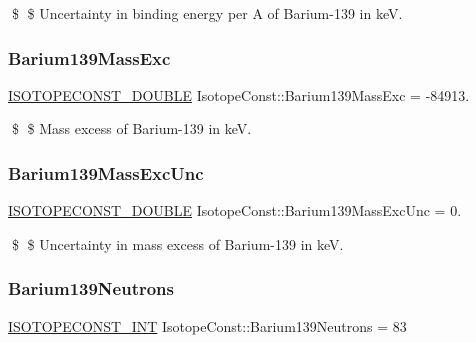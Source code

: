 \$ \$ Uncertainty in binding energy per A of Barium-\/139 in keV. \mbox{\label{group___isotope_const-_barium-_ba139_gaa83a2fff03d07d248f2a0d21d50c715b}} 
\subsubsection{\texorpdfstring{Barium139\+Mass\+Exc}{Barium139MassExc}}
{\footnotesize\ttfamily \mbox{\hyperlink{group___isotope_const-_macros_ga8f45a7272ce02c0b4c65c44636ed719a}{I\+S\+O\+T\+O\+P\+E\+C\+O\+N\+S\+T\+\_\+\+D\+O\+U\+B\+LE}} Isotope\+Const\+::\+Barium139\+Mass\+Exc = -\/84913.}

\$ \$ Mass excess of Barium-\/139 in keV. \mbox{\label{group___isotope_const-_barium-_ba139_ga38559e2d5de89fca0709afd7ba5b4d7e}} 
\subsubsection{\texorpdfstring{Barium139\+Mass\+Exc\+Unc}{Barium139MassExcUnc}}
{\footnotesize\ttfamily \mbox{\hyperlink{group___isotope_const-_macros_ga8f45a7272ce02c0b4c65c44636ed719a}{I\+S\+O\+T\+O\+P\+E\+C\+O\+N\+S\+T\+\_\+\+D\+O\+U\+B\+LE}} Isotope\+Const\+::\+Barium139\+Mass\+Exc\+Unc = 0.}

\$ \$ Uncertainty in mass excess of Barium-\/139 in keV. \mbox{\label{group___isotope_const-_barium-_ba139_ga2d3feab01fe431d855515f093fdacddb}} 
\subsubsection{\texorpdfstring{Barium139\+Neutrons}{Barium139Neutrons}}
{\footnotesize\ttfamily \mbox{\hyperlink{group___isotope_const-_macros_ga5f18360b3e99483a35c32d789e62621c}{I\+S\+O\+T\+O\+P\+E\+C\+O\+N\+S\+T\+\_\+\+I\+NT}} Isotope\+Const\+::\+Barium139\+Neutrons = 83}

